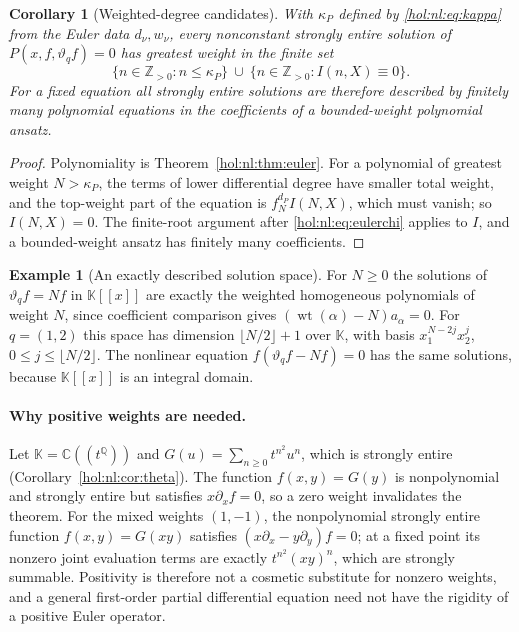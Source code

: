 \documentclass[11pt]{article}
\numberwithin{equation}{section}
\newtheorem{corollary}[theorem]{Corollary}
\theoremstyle{definition}
\newtheorem{example}[theorem]{Example}
\theoremstyle{remark}
\newcommand{\C}{\mathbb C}
\newcommand{\Q}{\mathbb Q}
\newcommand{\Z}{\mathbb Z}
\newcommand{\KK}{\mathbb K}
\newcommand{\wt}{\operatorname{wt}}
\begin{document}
\begin{corollary}[Weighted-degree candidates]\label{hol:nl:cor:eulerdegrees}
With $\kappa_P$ defined by \eqref{hol:nl:eq:kappa} from the Euler data
$d_\nu,w_\nu$, every nonconstant strongly entire solution of
$P(x,f,\vartheta_qf)=0$ has greatest weight in the finite set
\[
 \{n\in\Z_{>0}:n\le\kappa_P\}\ \cup\ \{n\in\Z_{>0}:I(n,X)\equiv0\}.
\]
For a fixed equation all strongly entire solutions are therefore described by
finitely many polynomial equations in the coefficients of a bounded-weight
polynomial ansatz.
\end{corollary}

\begin{proof}
Polynomiality is Theorem~\ref{hol:nl:thm:euler}. For a polynomial of greatest
weight $N>\kappa_P$, the terms of lower differential degree have smaller total
weight, and the top-weight part of the equation is $f_N^{d_P}I(N,X)$, which
must vanish; so $I(N,X)=0$. The finite-root argument after
\eqref{hol:nl:eq:eulerchi} applies to $I$, and a bounded-weight ansatz has
finitely many coefficients.
\end{proof}

\begin{example}[An exactly described solution space]\label{hol:nl:ex:eulerspace}
For $N\ge0$ the solutions of $\vartheta_qf=Nf$ in $\KK[[x]]$ are exactly the
weighted homogeneous polynomials of weight $N$, since coefficient comparison
gives $(\wt(\alpha)-N)a_\alpha=0$. For $q=(1,2)$ this space has dimension
$\lfloor N/2\rfloor+1$ over $\KK$, with basis $x_1^{N-2j}x_2^j$,
$0\le j\le\lfloor N/2\rfloor$. The nonlinear equation
$f(\vartheta_qf-Nf)=0$ has the same solutions, because $\KK[[x]]$ is an
integral domain.
\end{example}

\paragraph{Why positive weights are needed.}
Let $\KK=\C((t^\Q))$ and $G(u)=\sum_{n\ge0}t^{n^2}u^n$, which is strongly
entire (Corollary~\ref{hol:nl:cor:theta}). The function $f(x,y)=G(y)$ is
nonpolynomial and strongly entire but satisfies $x\partial_xf=0$, so a zero
weight invalidates the theorem. For the mixed weights $(1,-1)$, the
nonpolynomial strongly entire function $f(x,y)=G(xy)$ satisfies
$(x\partial_x-y\partial_y)f=0$; at a fixed point its nonzero joint evaluation
terms are exactly $t^{n^2}(xy)^n$, which are strongly summable. Positivity is
therefore not a cosmetic substitute for nonzero weights, and a general
first-order partial differential equation need not have the rigidity of a
positive Euler operator.
\end{document}
